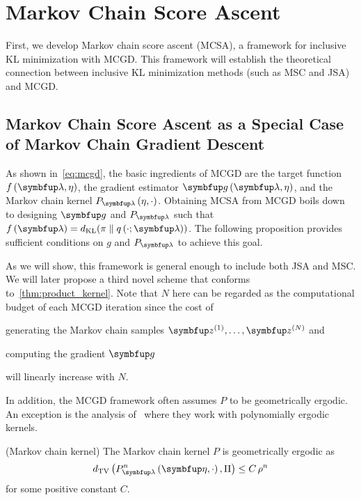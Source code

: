 
\vspace{-0.05in}
\section{Markov Chain Score Ascent}\label{section:mcsa}
\vspace{-0.05in}

First, we develop Markov chain score ascent (MCSA), a framework for inclusive KL minimization with MCGD.
This framework will establish the theoretical connection between inclusive KL minimization methods (such as MSC and JSA) and MCGD.

\vspace{-0.05in}
\subsection{Markov Chain Score Ascent as a Special Case of Markov Chain Gradient Descent}\label{section:convergence}
\vspace{-0.05in}
As shown in~\cref{eq:mcgd}, the basic ingredients of MCGD are the target function \(f\left(\vlambda, \eta\right)\), the gradient estimator \(\vg\left(\vlambda, \eta\right)\), and the Markov chain kernel \(P_{\vlambda}\left(\eta, \cdot\right)\).
Obtaining MCSA from MCGD boils down to designing \(\vg\) and \(P_{\vlambda}\) such that \(f\left(\vlambda\right) = \DKL{\pi}{q\left(\cdot; \vlambda\right)} \).
The following proposition provides sufficient conditions on \(g\) and \(P_{\vlambda}\) to achieve this goal.



As we will show, this framework is general enough to include both JSA and MSC.
We will later propose a third novel scheme that conforms to~\cref{thm:product_kernel}.
Note that \(N\) here can be regarded as the computational budget of each MCGD iteration since the cost of
\begin{enumerate*}[label=\textbf{(\roman*)}]
  \item generating the Markov chain samples \(\vz^{(1)}, \ldots, \vz^{(N)}\) and
  \item computing the gradient \(\vg\)
\end{enumerate*}
will linearly increase with \(N\).

In addition, the MCGD framework often assumes \(P\) to be geometrically ergodic.
An exception is the analysis of~\citet{debavelaere_convergence_2021} where they work with polynomially ergodic kernels.
\begin{assumption}{(Markov chain kernel)}\label{thm:kernel_conditions}
\vspace{-0.05in}
  The Markov chain kernel \(P\) is geometrically ergodic as
  {%
  \[
  \DTV{P_{\vlambda}^{n}\left(\veta, \cdot\right)}{ \Pi } \leq C \, \rho^{n}
  \]
  }
  for some positive constant \(C\).
\end{assumption}
\vspace{-0.05in}

